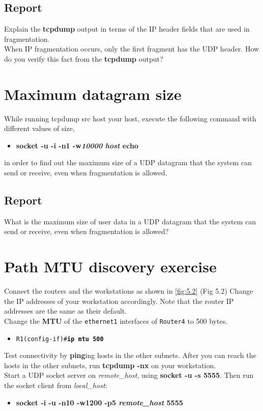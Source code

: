 \documentclass{../UTNetLab}
\begin{document}
	\subsection*{Report}
	Explain the \textbf{tcpdump} output in terms of the IP header fields that are used in fragmentation. \\
	When IP fragmentation occurs, only the first fragment has the UDP header.
	How do you verify this fact from the \textbf{tcpdump} output?


\section{Maximum datagram size}
\label{sec:MaxDatagramSize}
	While running tcpdump src host your host, execute the following command with different values of size,
	\begin{itemize}
		\item \textbf{socket -u -i -n1 -w\textit{10000} \textit{host} echo}
	\end{itemize}
	in order to find out the maximum size of a UDP datagram that the system can send or receive, even when fragmentation is allowed.

\subsection*{Report}
	What is the maximum size of user data in a UDP datagram that the system can send or receive, even when fragmentation is allowed?


\section*{Path MTU discovery exercise}
	Connect the routers and the workstations as shown in \autoref{fig:5.2} (Fig 5.2) Change the IP
	addresses of your workstation accordingly. Note that the router IP addresses are
	the same as their default.\\
	Change the \textbf{MTU} of the \texttt{ethernet1} interfaces of \texttt{Router4} to 500
	bytes.
	\begin{itemize}
		\item \texttt{R1(config-if)\#\textbf{ip mtu 500}}
	\end{itemize}
	Test connectivity by \textbf{ping}ing hosts in the other subnets. After you can reach the
	hosts in the other subnets, run \textbf{tcpdump -nx} on your workstation.\\
	Start a UDP socket server on \textit{remote\_host}, using \textbf{socket -u -s 5555}.
	Then run the socket client from \textit{local\_host}:
	\begin{itemize}
		\item \textbf{socket -i -u -n10 -w1200 -p5 \textit{remote\_host} 5555}
	\end{itemize}
\end{document}
